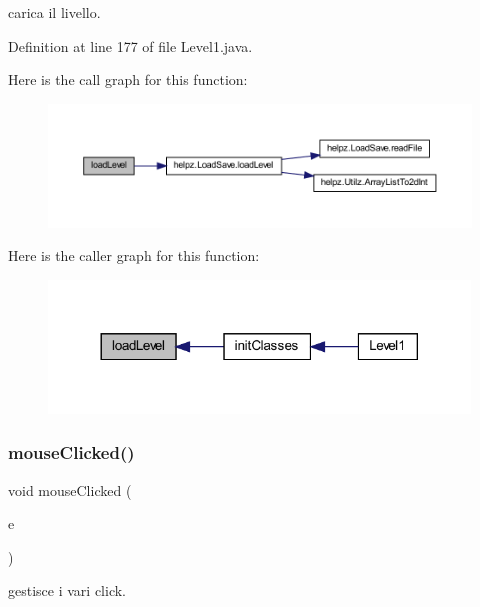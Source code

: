 carica il livello. 



Definition at line 177 of file Level1.\+java.

Here is the call graph for this function\+:\nopagebreak
\begin{figure}[H]
\begin{center}
\leavevmode
\includegraphics[width=350pt]{classscenes_1_1_level1_a286931cc46e197f4a85af7229fdc29a4_cgraph}
\end{center}
\end{figure}
Here is the caller graph for this function\+:\nopagebreak
\begin{figure}[H]
\begin{center}
\leavevmode
\includegraphics[width=317pt]{classscenes_1_1_level1_a286931cc46e197f4a85af7229fdc29a4_icgraph}
\end{center}
\end{figure}
\mbox{\label{classscenes_1_1_level1_a45d56bd84238e8b56589dfc732e2b2cf}} 
\subsubsection{\texorpdfstring{mouse\+Clicked()}{mouseClicked()}}
{\footnotesize\ttfamily void mouse\+Clicked (\begin{DoxyParamCaption}\item[{Mouse\+Event}]{e }\end{DoxyParamCaption})}



gestisce i vari click. 


